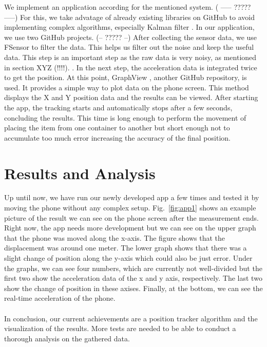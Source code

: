 \documentclass[12pt,twoside, hidelinks]{article}
\begin{document}
We implement an application according for the mentioned system. ( ----- ????? -----) For this, we  take advatage of already existing libraries on GitHub to avoid implementing complex algorithms, especially Kalman filter \cite{Kalman_filter_book}. In our application, we use two GitHub \cite{github} projects. (-- ????? --) After collecting the sensor data, we use FSensor \cite{KalebKE_2018} to filter the data. This helps us filter out the noise and keep the useful data. This step is an important step as the raw data is very noisy, as mentioned in section XYZ (!!!!). . In the next step, the acceleration data is integrated twice to get the position. At this point, GraphView \cite{Graphview}, another GitHub repository, is used. It provides a simple way to plot data on the phone screen. This method displays the X and Y position data and the results can be viewed. After starting the app, the tracking starts and automatically stops after a few seconds, concluding the results. This time is long enough to perform the movement of placing the item from one container to another but short enough not to accumulate too much error increasing the accuracy of the final position.

\section{Results and Analysis}
\label{sec:results}

Up until now, we have run our newly developed app a few times and tested it by moving the phone without any complex setup. Fig.~\ref{fig:app1} shows an example picture of the result we can see on the phone screen after the measurement ends. Right now, the app needs more development but we can see on the upper graph that the phone was moved along the x-axis. The figure shows that the displacement was around one meter. The lower graph shows that there was a slight change of position along the y-axis which could also be just error. Under the graphs, we can see four numbers, which are currently not well-divided but the first two show the acceleration data of the x and y axis, respectively. The last two show the change of position in these axises. Finally, at the bottom, we can see the real-time acceleration of the phone.
\\
\\
In conclusion, our current achievements are a position tracker algorithm and the visualization of the results. More tests are needed to be able to conduct a thorough analysis on the gathered data.
\end{document}
